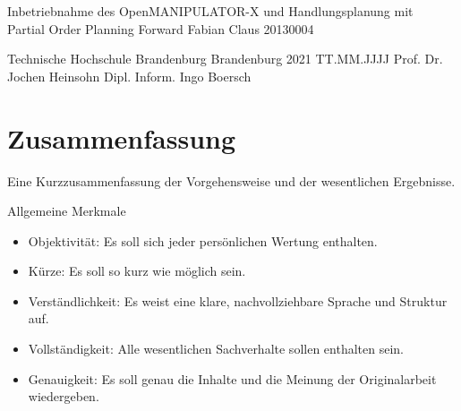 \usepackage{amssymb}




  \JMUTitle
      {Inbetriebnahme des OpenMANIPULATOR-X und Handlungsplanung mit\\ Partial Order Planning Forward}        %
      {Fabian Claus}                        %
      {20130004}
      
      {Technische Hochschule Brandenburg}  %
      {Brandenburg 2021}                          %
      {TT.MM.JJJJ}                              %
      {Prof. Dr. Jochen Heinsohn}               %
      {Dipl. Inform. Ingo Boersch}                          %

  \clearpage

\lhead{}
    \setcounter{page}{1}

\tableofcontents
\clearpage

\section*{Zusammenfassung}

Eine Kurzzusammenfassung der Vorgehensweise und der wesentlichen Ergebnisse.

Allgemeine Merkmale
\begin{itemize}
    \item Objektivität: Es soll sich jeder persönlichen Wertung enthalten.
    \item Kürze: Es soll so kurz wie möglich sein.
    \item Verständlichkeit: Es weist eine klare, nachvollziehbare Sprache und Struktur auf.
    \item Vollständigkeit: Alle wesentlichen Sachverhalte sollen enthalten sein.
    \item Genauigkeit: Es soll genau die Inhalte und die Meinung der Originalarbeit wiedergeben.
\end{itemize}{}

\newpage
{} %
\listoffigures


